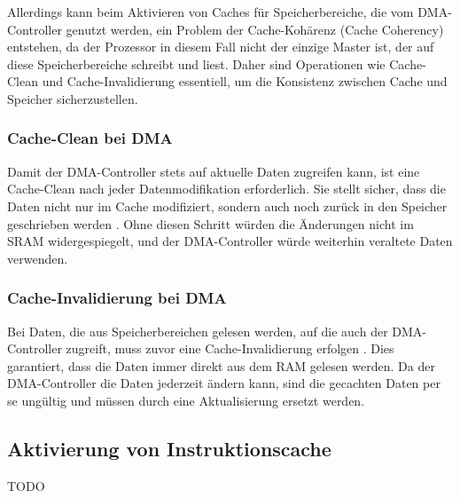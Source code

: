 Allerdings kann beim Aktivieren von Caches für Speicherbereiche, die vom
DMA-Controller genutzt werden, ein Problem der Cache-Kohärenz (Cache Coherency)
entstehen, da der Prozessor in diesem Fall nicht der einzige Master ist, der auf
diese Speicherbereiche schreibt und liest. Daher sind Operationen wie
Cache-Clean und Cache-Invalidierung essentiell, um die Konsistenz zwischen Cache
und Speicher sicherzustellen.

\subsubsection{Cache-Clean bei DMA}

Damit der DMA-Controller stets auf aktuelle Daten zugreifen kann, ist eine
Cache-Clean nach jeder Datenmodifikation erforderlich. Sie stellt sicher, dass
die Daten nicht nur im Cache modifiziert, sondern auch noch zurück in den
Speicher geschrieben werden \cite[S. 6]{an4839}. Ohne diesen Schritt würden die
Änderungen nicht im SRAM widergespiegelt, und der DMA-Controller würde weiterhin
veraltete Daten verwenden.

\subsubsection{Cache-Invalidierung bei DMA}

Bei Daten, die aus Speicherbereichen gelesen werden, auf die auch der
DMA-Controller zugreift, muss zuvor eine Cache-Invalidierung erfolgen
\cite{embeddedexpert_cache}. Dies garantiert, dass die Daten immer direkt aus
dem RAM gelesen werden. Da der DMA-Controller die Daten jederzeit ändern kann,
sind die gecachten Daten per se ungültig und müssen durch eine Aktualisierung
ersetzt werden.

\subsection{Aktivierung von Instruktionscache}

TODO

